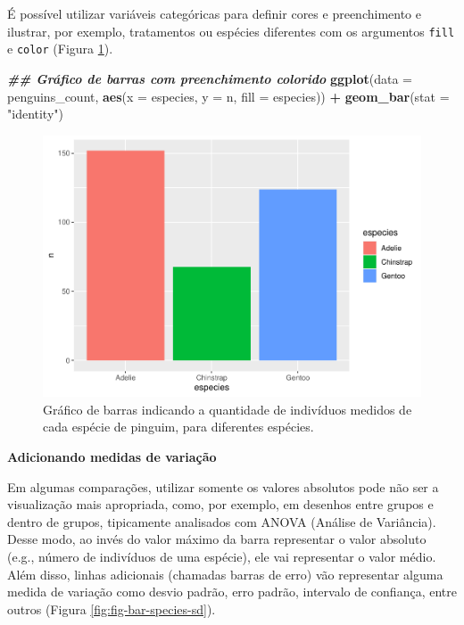 \documentclass[
]{article}
\newenvironment{Shaded}{\begin{snugshade}}{\end{snugshade}}
\newcommand{\AttributeTok}[1]{\textcolor[rgb]{0.13,0.29,0.53}{#1}}
\newcommand{\DocumentationTok}[1]{\textcolor[rgb]{0.56,0.35,0.01}{\textbf{\textit{#1}}}}
\newcommand{\FunctionTok}[1]{\textcolor[rgb]{0.13,0.29,0.53}{\textbf{#1}}}
\newcommand{\NormalTok}[1]{#1}
\newcommand{\SpecialCharTok}[1]{\textcolor[rgb]{0.81,0.36,0.00}{\textbf{#1}}}
\newcommand{\StringTok}[1]{\textcolor[rgb]{0.31,0.60,0.02}{#1}}
\begin{document}
É possível utilizar variáveis categóricas para definir cores e preenchimento e ilustrar, por exemplo, tratamentos ou espécies diferentes com os argumentos \texttt{fill} e \texttt{color} (Figura \ref{fig:fig-bar-species-fill}).

\begin{Shaded}
\begin{Highlighting}[]
\DocumentationTok{\#\# Gráfico de barras com preenchimento colorido}
\FunctionTok{ggplot}\NormalTok{(}\AttributeTok{data =}\NormalTok{ penguins\_count, }\FunctionTok{aes}\NormalTok{(}\AttributeTok{x =}\NormalTok{ especies, }\AttributeTok{y =}\NormalTok{ n, }\AttributeTok{fill =}\NormalTok{ especies)) }\SpecialCharTok{+}
    \FunctionTok{geom\_bar}\NormalTok{(}\AttributeTok{stat =} \StringTok{"identity"}\NormalTok{)}
\end{Highlighting}
\end{Shaded}

\begin{figure}
\includegraphics[width=0.75\linewidth,height=0.75\textheight]{epr_files/figure-latex/fig-bar-species-fill-1} \caption{Gráfico de barras indicando a quantidade de indivíduos medidos de cada espécie de pinguim, para diferentes espécies.}\label{fig:fig-bar-species-fill}
\end{figure}

\textbf{Adicionando medidas de variação}

Em algumas comparações, utilizar somente os valores absolutos pode não ser a visualização mais apropriada, como, por exemplo, em desenhos entre grupos e dentro de grupos, tipicamente analisados com ANOVA (Análise de Variância). Desse modo, ao invés do valor máximo da barra representar o valor absoluto (e.g., número de indivíduos de uma espécie), ele vai representar o valor médio. Além disso, linhas adicionais (chamadas barras de erro) vão representar alguma medida de variação como desvio padrão, erro padrão, intervalo de confiança, entre outros (Figura \ref{fig:fig-bar-species-sd}).
\end{document}
